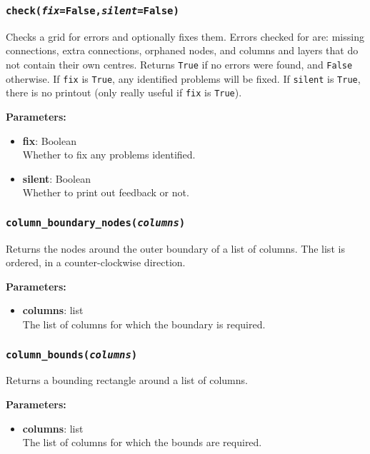 \subsubsection{\texttt{check(\emph{fix}=False,\emph{silent}=False)}}

Checks a grid for errors and optionally fixes them.  Errors checked for are: missing connections, extra connections, orphaned nodes, and columns and layers that do not contain their own centres.  Returns \texttt{True} if no errors were found, and \texttt{False} otherwise.  If \texttt{fix} is \texttt{True}, any identified problems will be fixed.  If \texttt{silent} is \texttt{True}, there is no printout (only really useful if \texttt{fix} is \texttt{True}).

\textbf{Parameters:}
\begin{itemize}
\item \textbf{fix}: Boolean\\
  Whether to fix any problems identified.
\item \textbf{silent}: Boolean\\
  Whether to print out feedback or not.
\end{itemize}

\subsubsection{\texttt{column\_boundary\_nodes(\emph{columns})}}

Returns the nodes around the outer boundary of a list of columns.  The list is ordered, in a counter-clockwise direction.

\textbf{Parameters:}
\begin{itemize}
\item \textbf{columns}: list\\
  The list of columns for which the boundary is required.
\end{itemize}

\subsubsection{\texttt{column\_bounds(\emph{columns})}}

Returns a bounding rectangle around a list of columns.

\textbf{Parameters:}
\begin{itemize}
\item \textbf{columns}: list\\
  The list of columns for which the bounds are required.
\end{itemize}

